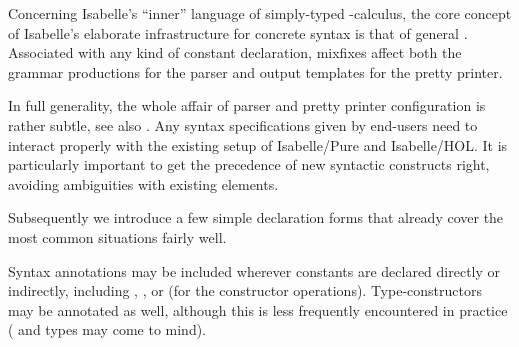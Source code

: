 %
\begin{isabellebody}%
\def\isabellecontext{Documents}%
\isamarkupfalse%
%
\isamarkuptrue%
%
\begin{isamarkuptext}%
Concerning Isabelle's ``inner'' language of simply-typed \isa{{\isasymlambda}}-calculus, the core concept of Isabelle's elaborate
  infrastructure for concrete syntax is that of general
  .  Associated with any kind of constant
  declaration, mixfixes affect both the grammar productions for the
  parser and output templates for the pretty printer.

  In full generality, the whole affair of parser and pretty printer
  configuration is rather subtle, see also \cite{isabelle-ref}.  Any
  syntax specifications given by end-users need to interact properly
  with the existing setup of Isabelle/Pure and Isabelle/HOL.  It is
  particularly important to get the precedence of new syntactic
  constructs right, avoiding ambiguities with existing elements.

  \medskip Subsequently we introduce a few simple declaration forms
  that already cover the most common situations fairly well.%
\end{isamarkuptext}%
\isamarkuptrue%
%
\isamarkuptrue%
%
\begin{isamarkuptext}%
Syntax annotations may be included wherever constants are declared
  directly or indirectly, including ,
  , or  (for the
  constructor operations).  Type-constructors may be annotated as
  well, although this is less frequently encountered in practice
  (\isa{{\isacharasterisk}} and \isa{{\isacharplus}} types may come to mind).


\end{isamarkuptext}
\end{isabellebody}
